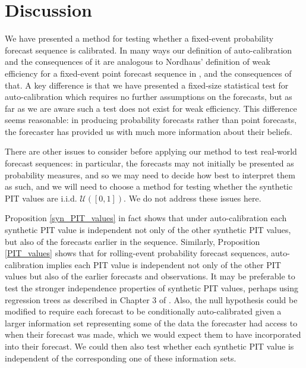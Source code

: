 \documentclass[aap]{imsart}
\theoremstyle{plain}
\theoremstyle{definition}
\begin{document}
\section{Discussion}\label{discussion}
We have presented a method for testing whether a fixed-event probability forecast sequence is calibrated. In many ways our definition of auto-calibration and the consequences of it are analogous to Nordhaus' definition of weak efficiency for a fixed-event point forecast sequence in \cite{nrd87}, and the consequences of that. A key difference is that we have presented a fixed-size statistical test for auto-calibration which requires no further assumptions on the forecasts, but as far as we are aware such a test does not exist for weak efficiency. This difference seems reasonable: in producing probability forecasts rather than point forecasts, the forecaster has provided us with much more information about their beliefs.

There are other issues to consider before applying our method to test real-world forecast sequences: in particular, the forecasts may not initially be presented as probability measures, and so we may need to decide how best to interpret them as such, and we will need to choose a method for testing whether the synthetic PIT values are i.i.d. $\mathcal{U}([0,1])$. We do not address these issues here.

Proposition \ref{syn_PIT_values} in fact shows that under auto-calibration each synthetic PIT value is independent not only of the other synthetic PIT values, but also of the forecasts earlier in the sequence. Similarly, Proposition \ref{PIT_values} shows that for rolling-event probability forecast sequences, auto-calibration implies each PIT value is independent not only of the other PIT values but also of the earlier forecasts and observations. It may be preferable to test the stronger independence properties of synthetic PIT values, perhaps using regression trees as described in Chapter 3 of \cite{Mds23}. Also, the null hypothesis could be modified to require each forecast to be conditionally auto-calibrated given a larger information set representing some of the data the forecaster had access to when their forecast was made, which we would expect them to have incorporated into their forecast. We could then also test whether each synthetic PIT value is independent of the corresponding one of these information sets.
\end{document}
